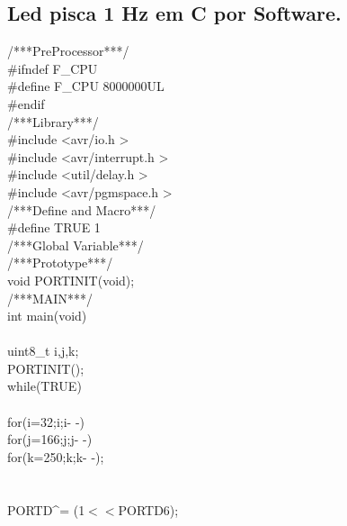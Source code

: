 \documentclass[titlepage, a4paper, 10pt, reqno, openany]{report}
\begin{document}
\subsection {Led pisca 1 Hz em C por Software.}	
\begin{minipage}[T]{.3\linewidth}
/***PreProcessor***/ \\
\#ifndef F\_CPU \\
\hspace*{.5cm}	\#define F\_CPU 8000000UL \\
\#endif \\
/***Library***/ \\
\#include \textless avr/io.h \textgreater \\
\#include \textless avr/interrupt.h \textgreater \\
\#include \textless util/delay.h \textgreater \\
\#include \textless avr/pgmspace.h \textgreater \\
/***Define and Macro***/ \\
\#define TRUE 1 \\
/***Global Variable***/ \\
/***Prototype***/ \\
void PORTINIT(void); \\
/***MAIN***/ \\
int main(void) \\
\textbraceleft \\
\hspace*{.5cm}	uint8\_t i,j,k; \\
\hspace*{.5cm}	PORTINIT(); \\
\hspace*{.5cm}    while(TRUE) \\
\hspace*{.5cm}    \textbraceleft \\
\hspace*{1cm}		for(i=32;i;i- -)\textbraceleft \\
\hspace*{1.5cm}			for(j=166;j;j- -)\textbraceleft \\
\hspace*{2cm}				for(k=250;k;k- -); \\
\hspace*{1.5cm}			\textbraceright \\
\hspace*{1cm}		\textbraceright \\
\hspace*{1cm}		PORTD\textasciicircum = (1$<<$PORTD6); \\

\end{minipage}
\end{document}
